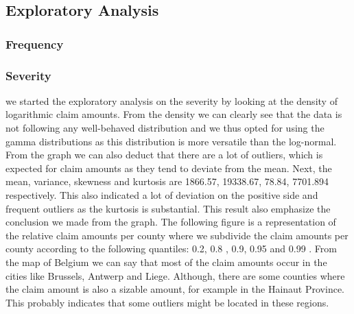\documentclass[
  12pt,
]{article}
\begin{document}
\hypertarget{exploratory-analysis}{%
\subsection{Exploratory Analysis}\label{exploratory-analysis}}

\hypertarget{frequency}{%
\subsubsection{Frequency}\label{frequency}}

\hypertarget{severity}{%
\subsubsection{Severity}\label{severity}}

we started the exploratory analysis on the severity by looking at the
density of logarithmic claim amounts. From the density we can clearly
see that the data is not following any well-behaved distribution and we
thus opted for using the gamma distributions as this distribution is
more versatile than the log-normal. From the graph we can also deduct
that there are a lot of outliers, which is expected for claim amounts as
they tend to deviate from the mean. Next, the mean, variance, skewness
and kurtosis are 1866.57, 19338.67, 78.84, 7701.894 respectively. This
also indicated a lot of deviation on the positive side and frequent
outliers as the kurtosis is substantial. This result also emphasize the
conclusion we made from the graph. The following figure is a
representation of the relative claim amounts per county where we
subdivide the claim amounts per county according to the following
quantiles: 0.2, 0.8 , 0.9, 0.95 and 0.99 . From the map of Belgium we
can say that most of the claim amounts occur in the cities like
Brussels, Antwerp and Liege. Although, there are some counties where the
claim amount is also a sizable amount, for example in the Hainaut
Province. This probably indicates that some outliers might be located in
these regions.
\end{document}

